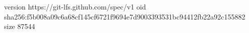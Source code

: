 version https://git-lfs.github.com/spec/v1
oid sha256:f5b008a09c6a68cf145cf6721f9694e7d9003393531bc94412fb22a92c155882
size 87544
